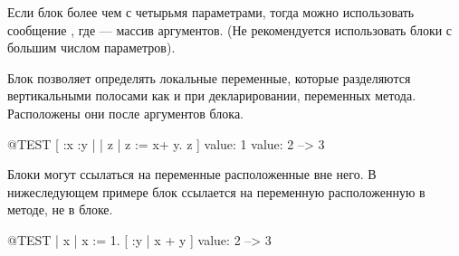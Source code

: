 \documentclass[a4paper,10pt,twoside]{book}
\begin{document}

Если  блок более чем с четырьмя параметрами, тогда можно использовать сообщение ,
где  --- массив аргументов.
(Не рекомендуется использовать блоки с большим числом параметров).


Блок позволяет определять локальные переменные,
которые разделяются вертикальными полосами как и при декларировании, переменных метода.
Расположены они после аргументов блока.

\begin{code}{@TEST}
[ :x :y | | z | z := x+ y. z ] value: 1 value: 2 --> 3
\end{code}


Блоки могут ссылаться на переменные расположенные вне него.
В нижеследующем примере блок ссылается на переменную  расположенную в методе, не в блоке.

\begin{code}{@TEST}
| x |
x := 1.
[ :y | x + y ] value: 2 --> 3
\end{code}

\end{document}
